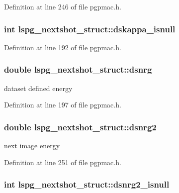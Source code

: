 Definition at line 246 of file pgpmac.h.\hypertarget{structlspg__nextshot__struct_a1686a72509cc1c3383ee95a790ddff14}{
\subsubsection[{dskappa\_\-isnull}]{\setlength{\rightskip}{0pt plus 5cm}int {\bf lspg\_\-nextshot\_\-struct::dskappa\_\-isnull}}}
\label{structlspg__nextshot__struct_a1686a72509cc1c3383ee95a790ddff14}


Definition at line 192 of file pgpmac.h.\hypertarget{structlspg__nextshot__struct_a371e574055fec7660b8f2e637eaf9f25}{
\subsubsection[{dsnrg}]{\setlength{\rightskip}{0pt plus 5cm}double {\bf lspg\_\-nextshot\_\-struct::dsnrg}}}
\label{structlspg__nextshot__struct_a371e574055fec7660b8f2e637eaf9f25}


dataset defined energy 

Definition at line 197 of file pgpmac.h.\hypertarget{structlspg__nextshot__struct_ae461439c2af31255227765c0fb61850f}{
\subsubsection[{dsnrg2}]{\setlength{\rightskip}{0pt plus 5cm}double {\bf lspg\_\-nextshot\_\-struct::dsnrg2}}}
\label{structlspg__nextshot__struct_ae461439c2af31255227765c0fb61850f}


next image energy 

Definition at line 251 of file pgpmac.h.\hypertarget{structlspg__nextshot__struct_aee9f8196dd9bcea832a60f2f0ea3a999}{
\subsubsection[{dsnrg2\_\-isnull}]{\setlength{\rightskip}{0pt plus 5cm}int {\bf lspg\_\-nextshot\_\-struct::dsnrg2\_\-isnull}}}
\label{structlspg__nextshot__struct_aee9f8196dd9bcea832a60f2f0ea3a999}


